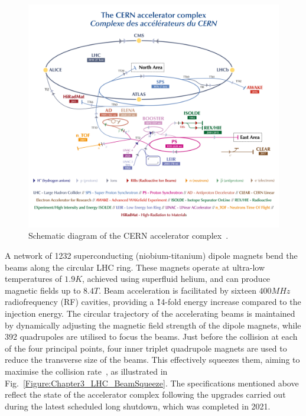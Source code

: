 \begin{figure}[h]
\centering
\includegraphics[width= 1.0\textwidth]{Figures/Chapter3/LHC_AcceleratorComplex.png}
\caption{Schematic diagram of the CERN accelerator complex~\cite{LHC_InjectorComplex}.}
\label{Figure:Chapter3_LHC_Complex}
\end{figure}

A network of 1232 superconducting (niobium-titanium) dipole magnets bend the beams along the circular LHC ring. These magnets operate at ultra-low temperatures of $1.9\unit{K}$, achieved using superfluid helium, and can produce magnetic fields up to $8.4\unit{T}$. Beam acceleration is facilitated by sixteen $400\unit{MHz}$ radiofrequency (RF) cavities, providing a \~14-fold energy increase compared to the injection energy. The circular trajectory of the accelerating beams is maintained by dynamically adjusting the magnetic field strength of the dipole magnets, while 392 quadrupoles are utilised to focus the beams. Just before the collision at each of the four principal points, four inner triplet quadrupole magnets are used to reduce the transverse size of the beams. This effectively squeezes them, aiming to maximise the collision rate~\cite{LHC_Run3}, as illustrated in Fig.~\ref{Figure:Chapter3_LHC_BeamSqueeze}. The specifications mentioned above reflect the state of the accelerator complex following the upgrades carried out during the latest scheduled long shutdown, which was completed in 2021.

